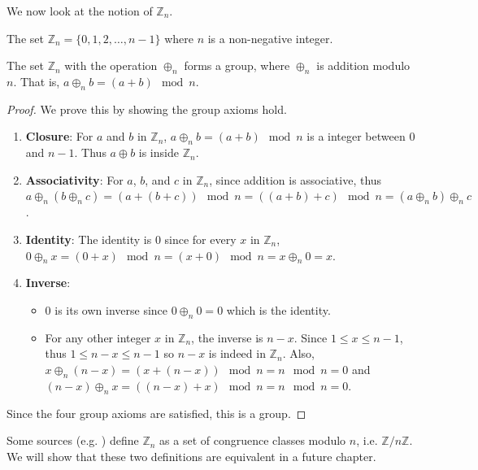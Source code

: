We now look at the notion of $\mathbb{Z}_n$.
\begin{definition}
    The set $\mathbb{Z}_n = \{0, 1, 2, \dots, n-1\}$ where $n$ is a non-negative integer.
\end{definition}
\begin{proposition}
    The set $\mathbb{Z}_n$ with the operation $\oplus_n$ forms a group, where $\oplus_n$ is addition modulo $n$. That is, $a \oplus_n b = (a + b) \mod{n}$.
\end{proposition}
\begin{proof}
    We prove this by showing the group axioms hold.
    \begin{enumerate}
        \item \textbf{Closure}: For $a$ and $b$ in $\mathbb{Z}_n$, $a \oplus_n b = (a + b) \mod{n}$ is a integer between 0 and $n - 1$. Thus $a \oplus b$ is inside $\mathbb{Z}_n$.
        \item \textbf{Associativity}: For $a$, $b$, and $c$ in $\mathbb{Z}_n$, since addition is associative, thus $a \oplus_n (b \oplus_n c) = (a + (b + c)) \mod{n} = ((a + b) + c) \mod{n} = (a \oplus_n b) \oplus_n c$.
        \item \textbf{Identity}: The identity is $0$ since for every $x$ in $\mathbb{Z}_n$, $0 \oplus_n x = (0 + x) \mod{n} = (x + 0) \mod{n} = x \oplus_n 0 = x$.
        \item \textbf{Inverse}:
        \begin{itemize}
            \item $0$ is its own inverse since $0 \oplus_n 0 = 0$ which is the identity.
            \item For any other integer $x$ in $\mathbb{Z}_n$, the inverse is $n - x$. Since $1 \leq x \leq n - 1$, thus $1 \leq n - x \leq n - 1$ so $n - x$ is indeed in $\mathbb{Z}_n$. Also, $x \oplus_n (n - x) = (x + (n - x)) \mod{n} = n \mod{n} = 0$ and $(n - x) \oplus_n x = ((n-x) + x)\mod{n} = n \mod{n} = 0$.
        \end{itemize}
    \end{enumerate}
    Since the four group axioms are satisfied, this is a group.
\end{proof}
\begin{remark}
    Some sources (e.g. \cite{clark_1984, humphreys_1996}) define $\mathbb{Z}_n$ as a set of congruence classes modulo $n$, i.e. $\mathbb{Z}/n\mathbb{Z}$. We will show that these two definitions are equivalent in a future chapter.
\end{remark}

